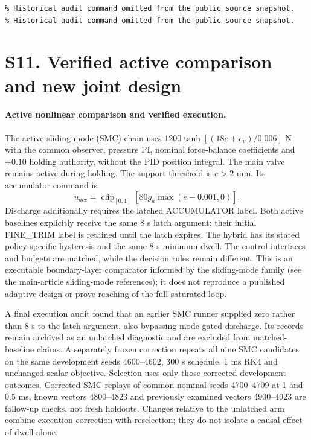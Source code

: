 \documentclass[11pt,a4paper]{article}
\begin{document}
\begin{verbatim}
% Historical audit command omitted from the public source snapshot.
% Historical audit command omitted from the public source snapshot.
\end{verbatim}

\section*{S11. Verified active comparison and new joint design}

\paragraph{Active nonlinear comparison and verified execution.}
The active sliding-mode (SMC) chain uses $1200\tanh[(18e+e_v)/0.006]$ N with the common observer, pressure PI, nominal force-balance coefficients and $\pm0.10$ holding authority, without the PID position integral. The main valve remains active during holding. The support threshold is $e>2$ mm. Its accumulator command is
\[
u_{acc}=\operatorname{clip}_{[0,1]}[80g_a\max(e-0.001,0)].
\]
Discharge additionally requires the latched ACCUMULATOR label. Both active baselines explicitly receive the same 8 s latch argument; their initial FINE\_TRIM label is retained until the latch expires. The hybrid has its stated policy-specific hysteresis and the same 8 s minimum dwell. The control interfaces and budgets are matched, while the decision rules remain different. This is an executable boundary-layer comparator informed by the sliding-mode family (see the main-article sliding-mode references); it does not reproduce a published adaptive design or prove reaching of the full saturated loop.

A final execution audit found that an earlier SMC runner supplied zero rather than 8 s to the latch argument, also bypassing mode-gated discharge. Its records remain archived as an unlatched diagnostic and are excluded from matched-baseline claims. A separately frozen correction repeats all nine SMC candidates on the same development seeds 4600--4602, 300 s schedule, 1 ms RK4 and unchanged scalar objective. Selection uses only those corrected development outcomes. Corrected SMC replays of common nominal seeds 4700--4709 at 1 and 0.5 ms, known vectors 4800--4823 and previously examined vectors 4900--4923 are follow-up checks, not fresh holdouts. Changes relative to the unlatched arm combine execution correction with reselection; they do not isolate a causal effect of dwell alone.
\end{document}
